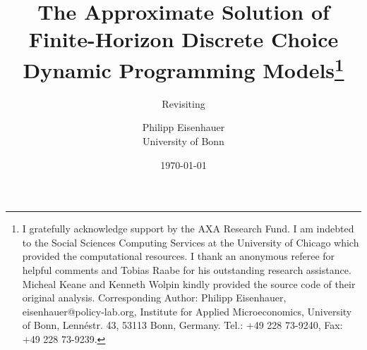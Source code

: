 \title{The Approximate Solution of Finite-Horizon Discrete Choice Dynamic Programming Models\thanks{I gratefully acknowledge support by the AXA Research Fund. I am indebted to the Social Sciences Computing Services at the University of Chicago which provided the computational resources. I thank an anonymous referee for helpful comments and Tobias Raabe for his outstanding research assistance. Micheal Keane and Kenneth Wolpin kindly provided the source code of their original analysis. Corresponding Author: Philipp Eisenhauer, eisenhauer@policy-lab.org, Institute for Applied Microeconomics, University of Bonn, Lenn\'{e}str. 43, 53113 Bonn, Germany. Tel.: +49 228 73-9240, Fax: +49 228 73-9239.}}
\subtitle{Revisiting  \citet{Keane.1994}}

\author{Philipp Eisenhauer\\
University of Bonn}
\date{\today}
